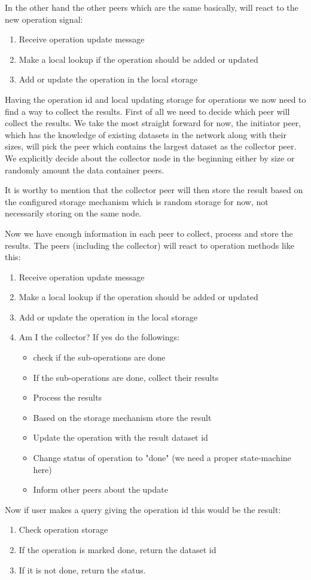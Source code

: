 In the other hand the other peers which are the same basically, will react to the new operation signal:

\begin{enumerate}
\item Receive operation update message
\item Make a local lookup if the operation should be added or updated
\item Add or update the operation in the local storage
\end{enumerate}

Having the operation id and local updating storage for operations we now need to find a way to collect the results.
First of all we need to decide which peer will collect the results. We take the most straight forward for now, the 
initiator peer, which has the knowledge of existing datasets in the network along with their sizes, will pick the 
peer which contains the largest dataset as the collector peer. We explicitly decide about the collector node in the
beginning either by size or randomly amount the data container peers.

It is worthy to mention that the collector peer will then store the result based on the configured storage mechanism 
which is random storage for now, not necessarily storing on the same node.

Now we have enough information in each peer to collect, process and store the results. The peers (including the collector)
 will react to operation methods like this:

\begin{enumerate}
\item Receive operation update message
\item Make a local lookup if the operation should be added or updated
\item Add or update the operation in the local storage
\item Am I the collector? If yes do the followings:
\begin{itemize}
\item check if the sub-operations are done
\item If the sub-operations are done, collect their results
\item Process the results
\item Based on the storage mechanism store the result
\item Update the operation with the result dataset id
\item Change status of operation to "done" (we need a proper state-machine here)
\item Inform other peers about the update
\end{itemize}
\end{enumerate}

Now if user makes a query giving the operation id this would be the result:

\begin{enumerate}
\item Check operation storage
\item If the operation is marked done, return the dataset id
\item If it is not done, return the status.
\end{enumerate}
